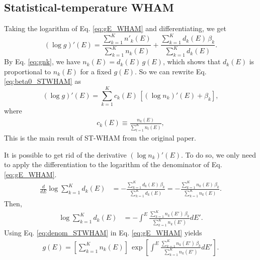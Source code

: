 \documentclass[aip,jcp,preprint,notitlepage, superscriptaddress]{revtex4-1}
\begin{document}
\subsection{Statistical-temperature WHAM}



Taking the logarithm of Eq. \eqref{eq:gE_WHAM} and differentiating,
we get
\begin{equation}
(\log g)'(E)
=
\frac{ \sum_{k = 1}^K n'_k(E) }
     { \sum_{k = 1}^K n_k(E) }
+
\frac{ \sum_{k = 1}^K d_k(E) \, \beta_k }
     { \sum_{k = 1}^K d_k(E) }.
\label{eq:beta0_STWHAM}
\end{equation}
%
By Eq. \eqref{eq:gnk},
we have
$n_k(E) = d_k(E) \, g(E)$,
which shows that
$d_k(E)$
is proportional to $n_k(E)$
for a fixed $g(E)$.
%
So we can rewrite Eq. \eqref{eq:beta0_STWHAM} as
%
\begin{equation}
(\log g)'(E)
=
\sum_{k = 1}^K c_k(E) \, \left[ (\log n_k)'(E)  + \beta_k \right],
\label{eq:beta_STWHAM}
\end{equation}
%
where
\begin{align}
  c_k(E) \equiv \frac{ n_k(E)  }{ \sum_{l = 1}^{K} n_l(E) },
  \label{eq:ck}
\end{align}
%
This is the main result of ST-WHAM
from the original paper\cite{
kim2011}.


It is possible to get rid of
the derivative $(\log n_k)'(E)$.
%
To do so, we only need to apply the differentiation
to the logarithm of the denominator of Eq. \eqref{eq:gE_WHAM}.
%
\begin{align}
\frac{d}{dE}
\log
  \sum_{k = 1}^K d_k(E)
&=
-
\frac{
  \sum_{k = 1}^K d_k(E) \, \beta_k
}
{
  \sum_{k = 1}^K d_k(E)
}
=
-
\frac{
  \sum_{k = 1}^K n_k(E) \, \beta_k
}
{
  \sum_{k = 1}^K n_k(E)
}.
\label{eq:ddenom_STWHAM}
\end{align}
%
Then,
%
\begin{align}
\log \sum_{k = 1}^K d_k(E)
&=
-
\int^E
\frac{
  \sum_{k = 1}^K n_k(E') \, \beta_k
}
{
  \sum_{k = 1}^K n_k(E')
} dE'.
\label{eq:denom_STWHAM}
\end{align}
%
Using Eq. \eqref{eq:denom_STWHAM} in Eq. \eqref{eq:gE_WHAM} yields
%
\begin{align}
g(E)
=
\left[
  \sum_{k = 1}^K n_k(E)
\right]
\,
\exp
\left[
\int^E
    \frac{ \sum_{k = 1}^K n_k(E') \, \beta_k }
         { \sum_{k = 1}^K n_k(E') }
  dE'
\right].
\label{eq:g_STWHAM}
\end{align}
\end{document}
